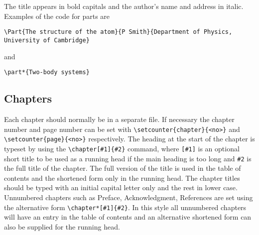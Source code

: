 The title 
appears in bold capitals and the author's name and address in italic.
Examples of the code for parts are
\begin{verbatim}
\Part{The structure of the atom}{P Smith}{Department of Physics,
University of Cambridge}
\end{verbatim}
and
\begin{verbatim}
\part*{Two-body systems}
\end{verbatim}



\subsection{Chapters}
Each chapter should normally be in a separate file.
If necessary the chapter number and page number can be set with
\verb"\setcounter{chapter}{<no>}" and \verb"\setcounter{page}{<no>}"
respectively. The heading at the start of the 
chapter is typeset by using the 
\verb"\chapter[#1]{#2}" command, where \verb"[#1]" is an optional
short title to be used as a running head if the main heading is too long
and \verb"#2" is the full title of the chapter. The full version of the
title is used in the table of contents and the shortened form only in the
running head.
The chapter titles should be typed with an initial capital letter only and the rest in lower case.
Unnumbered chapters 
such as Preface, Acknowledgment, References are 
set using the alternative form \verb"\chapter*[#1]{#2}". In this style all 
unnumbered chapters will have an entry in the table of contents 
and an alternative shortened form can also be supplied for the running head.  

